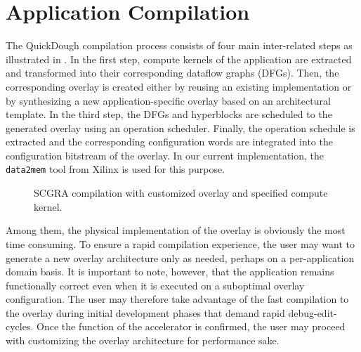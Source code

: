 \section{Application Compilation} \label{sec:scgracompile}

The QuickDough compilation process consists of four main inter-related steps as illustrated in .  In the first step, compute kernels of the application are extracted and transformed into their corresponding dataflow graphs (DFGs).  Then, the corresponding overlay is created either by reusing an existing implementation or by synthesizing a new application-specific overlay based on an architectural template.
In the third step, the DFGs and hyperblocks are scheduled to the generated overlay using an operation scheduler.
Finally, the operation schedule is extracted and the corresponding configuration words are integrated into the configuration bitstream of the overlay.  In our current implementation, the \texttt{data2mem} tool from Xilinx is used for this purpose.

\begin{figure}
\caption{SCGRA compilation with customized overlay and specified compute kernel.}
\label{fig:scgra-compile}
\end{figure}


Among them, the physical implementation of the overlay is obviously the most time consuming.
To ensure a rapid compilation experience, the user may want to generate a new overlay architecture only as needed, perhaps on a per-application domain basis.  It is important to note, however, that the application remains functionally correct even when it is executed on a suboptimal overlay configuration.
The user may therefore take advantage of the fast compilation to the overlay during initial development phases that demand rapid debug-edit-cycles.
Once the function of the accelerator is confirmed, the user may proceed with customizing the overlay architecture for performance sake.


